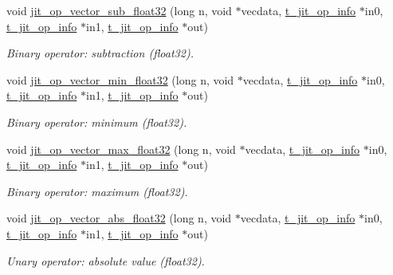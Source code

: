 \begin{DoxyCompactItemize}
void \hyperlink{group__opvecmod_ga1ef0e86107326c19fbe174b99aa8fb35}{jit\_\-op\_\-vector\_\-sub\_\-float32} (long n, void $\ast$vecdata, \hyperlink{structt__jit__op__info}{t\_\-jit\_\-op\_\-info} $\ast$in0, \hyperlink{structt__jit__op__info}{t\_\-jit\_\-op\_\-info} $\ast$in1, \hyperlink{structt__jit__op__info}{t\_\-jit\_\-op\_\-info} $\ast$out)
\begin{DoxyCompactList}\small\item\em Binary operator: subtraction (float32). \item\end{DoxyCompactList}\item 
void \hyperlink{group__opvecmod_ga62f19f6a8c37832e5e7a9bc8586a91c6}{jit\_\-op\_\-vector\_\-min\_\-float32} (long n, void $\ast$vecdata, \hyperlink{structt__jit__op__info}{t\_\-jit\_\-op\_\-info} $\ast$in0, \hyperlink{structt__jit__op__info}{t\_\-jit\_\-op\_\-info} $\ast$in1, \hyperlink{structt__jit__op__info}{t\_\-jit\_\-op\_\-info} $\ast$out)
\begin{DoxyCompactList}\small\item\em Binary operator: minimum (float32). \item\end{DoxyCompactList}\item 
void \hyperlink{group__opvecmod_ga69741058015d7aa7ec0c0874e3b20192}{jit\_\-op\_\-vector\_\-max\_\-float32} (long n, void $\ast$vecdata, \hyperlink{structt__jit__op__info}{t\_\-jit\_\-op\_\-info} $\ast$in0, \hyperlink{structt__jit__op__info}{t\_\-jit\_\-op\_\-info} $\ast$in1, \hyperlink{structt__jit__op__info}{t\_\-jit\_\-op\_\-info} $\ast$out)
\begin{DoxyCompactList}\small\item\em Binary operator: maximum (float32). \item\end{DoxyCompactList}\item 
void \hyperlink{group__opvecmod_ga7cda6bd2a2d1163a7431f0be8015b0f5}{jit\_\-op\_\-vector\_\-abs\_\-float32} (long n, void $\ast$vecdata, \hyperlink{structt__jit__op__info}{t\_\-jit\_\-op\_\-info} $\ast$in0, \hyperlink{structt__jit__op__info}{t\_\-jit\_\-op\_\-info} $\ast$in1, \hyperlink{structt__jit__op__info}{t\_\-jit\_\-op\_\-info} $\ast$out)
\begin{DoxyCompactList}\small\item\em Unary operator: absolute value (float32). \item\end{DoxyCompactList}\item 

\end{DoxyCompactItemize}

